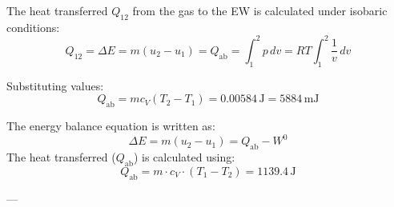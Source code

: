 The heat transferred \( Q_{12} \) from the gas to the EW is calculated under isobaric conditions:  
\[
Q_{12} = \Delta E = m(u_2 - u_1) = Q_{\text{ab}} = \int_1^2 p \, dv = R T \int_1^2 \frac{1}{v} \, dv
\]  

Substituting values:  
\[
Q_{\text{ab}} = m c_V (T_2 - T_1) = 0.00584 \, \text{J} = 5884 \, \text{mJ}
\]

The energy balance equation is written as:  
\[
\Delta E = m(u_2 - u_1) = Q_{\text{ab}} - W^0
\]  
The heat transferred (\( Q_{\text{ab}} \)) is calculated using:  
\[
Q_{\text{ab}} = m \cdot c_V \cdot (T_1 - T_2) = 1139.4 \, \text{J}
\]  

---